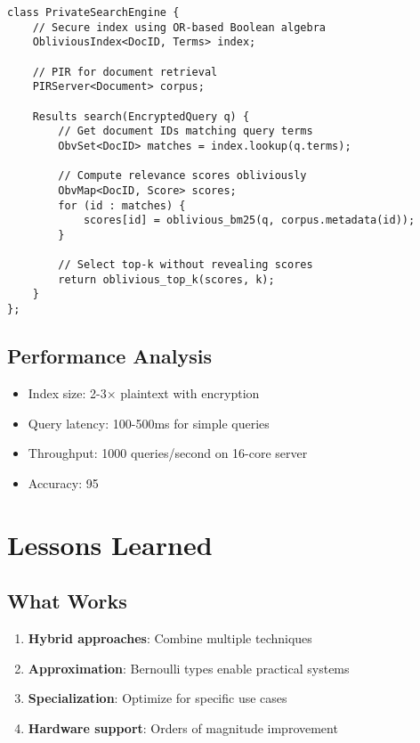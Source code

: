 \documentclass[11pt,final,hidelinks]{article}
\begin{document}
\begin{verbatim}
class PrivateSearchEngine {
    // Secure index using OR-based Boolean algebra
    ObliviousIndex<DocID, Terms> index;
    
    // PIR for document retrieval
    PIRServer<Document> corpus;
    
    Results search(EncryptedQuery q) {
        // Get document IDs matching query terms
        ObvSet<DocID> matches = index.lookup(q.terms);
        
        // Compute relevance scores obliviously
        ObvMap<DocID, Score> scores;
        for (id : matches) {
            scores[id] = oblivious_bm25(q, corpus.metadata(id));
        }
        
        // Select top-k without revealing scores
        return oblivious_top_k(scores, k);
    }
};
\end{verbatim}

\subsection{Performance Analysis}

\begin{itemize}
    \item Index size: 2-3× plaintext with encryption
    \item Query latency: 100-500ms for simple queries
    \item Throughput: 1000 queries/second on 16-core server
    \item Accuracy: 95%
\end{itemize}

\section{Lessons Learned}

\subsection{What Works}

\begin{enumerate}
    \item \textbf{Hybrid approaches}: Combine multiple techniques
    \item \textbf{Approximation}: Bernoulli types enable practical systems
    \item \textbf{Specialization}: Optimize for specific use cases
    \item \textbf{Hardware support}: Orders of magnitude improvement
\end{enumerate}
\end{document}
